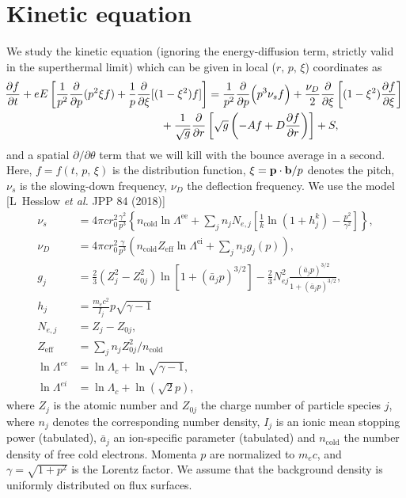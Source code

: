 \documentclass[11pt,a4paper]{article}
\newcommand{\sub}[1]{\ensuremath{_{\text{#1}}}}
\renewcommand{\b}[1]{\ensuremath{ {\bf #1 } }}
\begin{document}
\section{Kinetic equation}
We study the kinetic equation (ignoring the energy-diffusion term, strictly valid in the superthermal limit) which can be given in local ($r,\,p,\,\xi$) coordinates as 
\begin{align}
\hspace{-1mm}\frac{\partial f}{\partial t} + eE\left[\frac{1}{p^2}\frac{\partial}{\partial p}(p^2\xi f)  + \frac{1}{p}\frac{\partial}{\partial \xi}[(1-\xi^2) f]\right] &= \frac{1}{p^2}\frac{\partial}{\partial p}\Big(p^3 \nu_s  f\Big) + \frac{\nu_D}{2}\frac{\partial}{\partial \xi}\left[(1-\xi^2)\frac{\partial f}{\partial \xi}\right] \nonumber \\
&\hspace{-15mm} + \frac{1}{\sqrt{g}}\frac{\partial}{\partial r}\left[ \sqrt{g}\left( -Af+D\frac{\partial f}{\partial r}\right)\right] + S,
\end{align}
and a spatial $\partial/\partial \theta$ term that we will kill with the bounce average in a second.
Here, $f=f(t,\,p,\,\xi)$ is the distribution function, $\xi = \b{p}\cdot\b{b}/p$ denotes the pitch, $\nu_s$ is the slowing-down frequency, $\nu_D$ the deflection frequency. We use the model [L~Hesslow \emph{et al.} JPP 84 (2018)]
\begin{align}
\nu_s &= 4\pi c r_0^2 \frac{\gamma^2}{p^3} \left\{n\sub{cold} \ln\Lambda^\text{ee} + \sum_j n_j N_{e,j}\left[\frac{1}{k}\ln(1+ h_j^k)  - \frac{p^2}{\gamma^2}\right]\right\} , \nonumber \\
\nu_D &= 4\pi c r_0^2\frac{\gamma}{p^3} \left( n\sub{cold} Z\sub{eff} \ln\Lambda^\text{ei} + \sum_j n_j g_j(p) \right), \nonumber \\
g_j &= \frac{2}{3} (Z_j^2-Z_{0j}^2)\ln[1+ (\bar{a}_jp)^{3/2}] - \frac{2}{3}N_{ej}^2\frac{(\bar{a}_j p)^{3/2}}{1+(\bar{a}_j p)^{3/2}}, \nonumber \\
h_j &= \frac{m_e c^2}{I_j}p\sqrt{\gamma-1}\nonumber \\
N_{e,j} &= Z_j-Z_{0j}, \nonumber \\
Z\sub{eff} &= \sum_j n_j Z_{0j}^2/n\sub{cold}  \nonumber \\
\ln\Lambda^{ee} &= \ln\Lambda_c + \ln\sqrt{\gamma-1}, \nonumber \\
\ln\Lambda^{ei} &= \ln\Lambda_c + \ln(\sqrt{2}p), 
\end{align}
where $Z_j$ is the atomic number and $Z_{0j}$ the charge number of particle species $j$, where $n_j$ denotes the corresponding number density, $I_j$ is an ionic mean stopping power (tabulated), $\bar{a}_j$ an ion-specific parameter (tabulated) and $n\sub{cold}$ the number density of free cold electrons. Momenta $p$ are normalized to $m_e c$, and $\gamma = \sqrt{1+p^2}$ is the Lorentz factor. We assume that the background density is uniformly distributed on flux surfaces.
\end{document}
